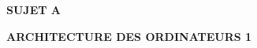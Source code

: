 \documentclass[11pt,a4paper]{article}
\newcommand{\TitreMatiere}{Architecture des Ordinateurs 1}
\begin{document}

%
%

\clearpage



\vfillFirst

\begin{center}

\begin{LARGE}
\textbf{SUJET A}

\bigskip

\textbf{\MakeUppercase{\TitreMatiere}}
\end{LARGE}

\end{center}

\vfillLast
\end{document}
